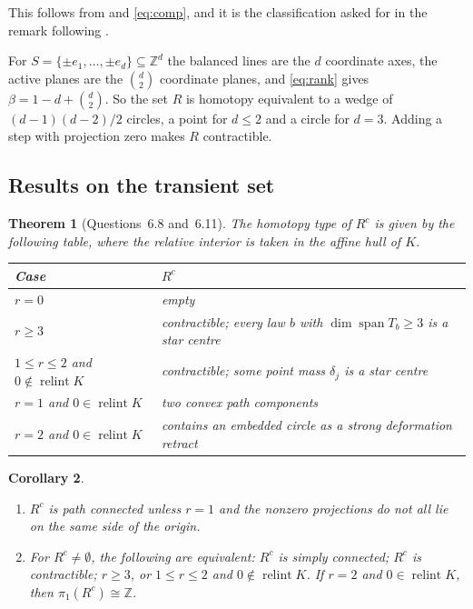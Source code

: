 \documentclass[11pt]{article}
\newtheorem{theorem}{Theorem}[section]
\newtheorem{corollary}[theorem]{Corollary}
\theoremstyle{remark}
\DeclareMathOperator{\spn}{span}
\DeclareMathOperator{\relint}{relint}
\newcommand{\Z}{\mathbb{Z}}
\begin{document}
This follows from  and \eqref{eq:comp}, and it is the classification asked for in the remark following
\cite[Example~6.4]{LMW}.

For $S=\{\pm e_1,\dots,\pm e_d\}\subseteq\Z^d$ the balanced lines are the $d$ coordinate axes, the active planes are the
$\binom d2$ coordinate planes, and \eqref{eq:rank} gives $\beta=1-d+\binom d2$. So the set $R$ is homotopy equivalent to
a wedge of $(d-1)(d-2)/2$ circles, a point for $d\le 2$ and a circle for $d=3$. Adding a step with projection zero makes
$R$ contractible.

\subsection{Results on the transient set}

\begin{theorem}[Questions~6.8 and~6.11]\label{thm:trans}
The homotopy type of $R^c$ is given by the following table, where the relative interior is taken in the affine hull of $K$.
\begin{center}
\begin{tabular}{@{}ll@{}}
\toprule
Case & $R^c$\\
\midrule
$r=0$ & empty\\
$r\ge 3$ & contractible; every law $b$ with $\dim\spn T_b\ge 3$ is a star centre\\
$1\le r\le 2$ and $0\notin\relint K$ & contractible; some point mass $\delta_j$ is a star centre\\
$r=1$ and $0\in\relint K$ & two convex path components\\
$r=2$ and $0\in\relint K$ & contains an embedded circle as a strong deformation retract\\
\bottomrule
\end{tabular}
\end{center}
\end{theorem}

\begin{corollary}\label{cor:trans}
\begin{enumerate}[label=\textup{(\roman*)},nosep]
\item $R^c$ is path connected unless $r=1$ and the nonzero projections do not all lie on the same side of the origin.
\item For $R^c\neq\emptyset$, the following are equivalent: $R^c$ is simply connected; $R^c$ is contractible; $r\ge 3$,
or $1\le r\le 2$ and $0\notin\relint K$. If $r=2$ and $0\in\relint K$, then $\pi_1(R^c)\cong\Z$.
\end{enumerate}
\end{corollary}
\end{document}
